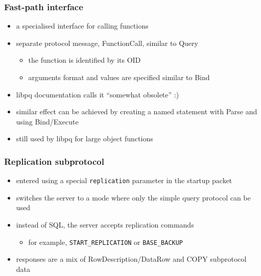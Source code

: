 \documentclass{beamer}
\begin{document}
\begin{frame}
  \frametitle{Fast-path interface}

  \begin{itemize}
  \item a specialised interface for calling functions
  \item separate protocol message, FunctionCall, similar to Query
    \begin{itemize}
    \item the function is identified by its OID
    \item arguments format and values are specified similar to Bind
    \end{itemize}
  \item libpq documentation calls it ``somewhat obsolete'' :)
  \item similar effect can be achieved by creating a named statement with Parse
    and using Bind/Execute
  \item still used by libpq for large object functions
  \end{itemize}

\end{frame}

\begin{frame}
  \frametitle{Replication subprotocol}

  \begin{itemize}
  \item entered using a special \texttt{replication} parameter in the startup
    packet
  \item switches the server to a mode where only the simple query protocol can
    be used
  \item instead of SQL, the server accepts replication commands
    \begin{itemize}
    \item for example, \texttt{START\_REPLICATION} or \texttt{BASE\_BACKUP}
    \end{itemize}
  \item responses are a mix of RowDescription/DataRow and COPY subprotocol data
  \end{itemize}
\end{frame}
\end{document}
